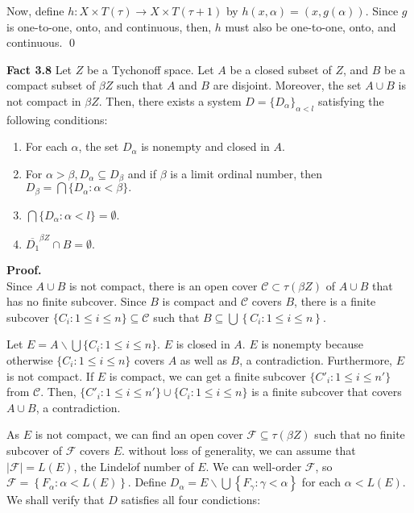 \documentclass{article}
\begin{document}
\vskip 10pt


Now, define $h: X\times T(\tau)\rightarrow X\times T(\tau+1)$ by $h(x,\alpha)=(x,g(\alpha)).$ Since $g$ is one-to-one, onto, and continuous, then, $h$ must also be one-to-one, onto, and continuous. \qed


\vskip 40pt


\textbf{Fact 3.8} Let $Z$ be a Tychonoff space. Let $A$ be a closed subset of $Z$,  and $B$ be a compact subset of $\beta Z$ such that $A$ and $B$ are disjoint. Moreover, the set $A\cup B$ is not compact in $\beta Z$. 
Then, there exists a system $D=\{D_\alpha\}_{\alpha<l}$ satisfying the following conditions:
\begin{enumerate}
\item For each $  \alpha  $, the set $ D_\alpha  $ is nonempty and closed in $A$.
\item For $ \alpha>\beta, D_\alpha \subseteq D_\beta  $ and if $  \beta $ is a limit ordinal number, then\\$  D_\beta=\bigcap \{D_\alpha:\alpha <\beta\}.$
\item $ \bigcap\{D_\alpha: \alpha<l\}=\emptyset . $
\item $\overline{D_1}^{\beta Z}\cap B =\emptyset.$
	 
\end{enumerate}

\textbf{Proof.} \\
Since $A\cup B $ is not compact, there is an open cover $\mathcal{C} \subset \tau(\beta Z)$ of $A\cup B$ that has no finite subcover.  Since $B$ is compact and $\mathcal{C}$ covers $B$, there is a finite subcover $\{C_i:1\leq i \leq n\}\subseteq \mathcal{C}$ such that $B\subseteq  \bigcup\left\{C_i:1\leq i \leq n\right\}$.
\vskip 10pt

Let $E=A\backslash \bigcup \{C_i:1\leq i \leq n\}$. $E$ is closed in $A$. $E$ is nonempty because otherwise $\{C_i:1\leq i \leq n\}$ covers $A$ as well as $B$, a contradiction. Furthermore, $E$ is not compact. If $E$ is compact, we can get a finite subcover $\{C'_i:1\leq i\leq n'\}$ from $\mathcal{C}$. Then, $\{C'_i:1\leq i\leq n'\} \cup \{C_i:1\leq i \leq n\}$ is a finite subcover that covers $A\cup B$, a contradiction. 


\vskip 10pt


As $E$ is not compact, we can find an open cover $\mathcal{F}\subseteq \tau(\beta Z)$ such that no finite subcover of $\mathcal{F}$ covers $E$. 
without loss of generality, we can assume that $|\mathcal{F}|=L(E)$, the Lindel$\ddot{o}$f number of $E$. We can well-order $\mathcal{F}$, so $\mathcal{F}=\left\{F_\alpha: \alpha<L(E)\right\}$.
Define $D_\alpha=E\backslash \bigcup \left\{F_\gamma: \gamma<\alpha\right\}$ for each $\alpha < L(E)$. We shall verify that $D$ satisfies all four condictions:
\end{document}

